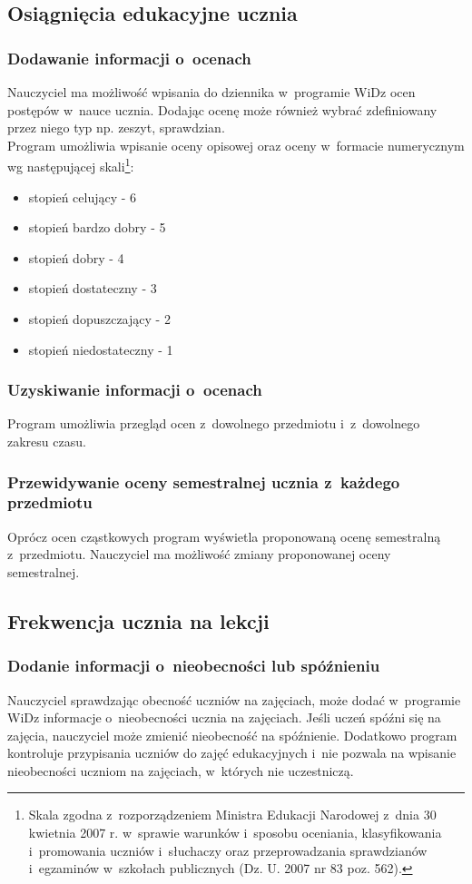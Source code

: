 \documentclass[12pt,leqno,twoside]{mwart}
\begin{document}
\subsection{Osiągnięcia edukacyjne ucznia}
\subsubsection{Dodawanie informacji o~ocenach}
\noindent Nauczyciel ma możliwość wpisania do dziennika w~programie WiDz ocen postępów w~nauce ucznia. Dodając ocenę może również wybrać zdefiniowany przez niego typ  np. zeszyt, sprawdzian. \\
\indent Program umożliwia wpisanie oceny opisowej oraz oceny w~formacie numerycznym wg następującej skali\footnote{Skala zgodna z~rozporządzeniem Ministra Edukacji Narodowej z~dnia 30 kwietnia 2007 r. w~sprawie warunków i~sposobu oceniania, klasyfikowania i~promowania uczniów i~słuchaczy oraz przeprowadzania sprawdzianów i~egzaminów w~szkołach publicznych (Dz. U. 2007 nr 83 poz. 562).}:
\begin{itemize}
	\item stopień celujący - 6
	\item stopień bardzo dobry - 5
	\item stopień dobry - 4
	\item stopień dostateczny - 3
	\item stopień dopuszczający - 2
	\item stopień niedostateczny - 1 
\end{itemize} 

\subsubsection{Uzyskiwanie informacji o~ocenach}
\noindent Program umożliwia przegląd ocen z~dowolnego przedmiotu i~z~dowolnego zakresu czasu.

\subsubsection{Przewidywanie oceny semestralnej ucznia z~każdego przedmiotu}
\noindent Oprócz ocen cząstkowych program wyświetla proponowaną ocenę semestralną z~przedmiotu. Nauczyciel ma możliwość zmiany proponowanej oceny semestralnej.

\subsection{Frekwencja ucznia na lekcji}
\subsubsection{Dodanie informacji o~nieobecności lub spóźnieniu}
\noindent Nauczyciel sprawdzając obecność uczniów na zajęciach, może dodać w~programie WiDz informacje o~nieobecności ucznia na zajęciach. Jeśli uczeń spóźni się na zajęcia, nauczyciel może zmienić nieobecność na spóźnienie. Dodatkowo program kontroluje przypisania uczniów do zajęć edukacyjnych i~nie pozwala na wpisanie nieobecności uczniom na zajęciach, w~których nie uczestniczą.
\end{document}

